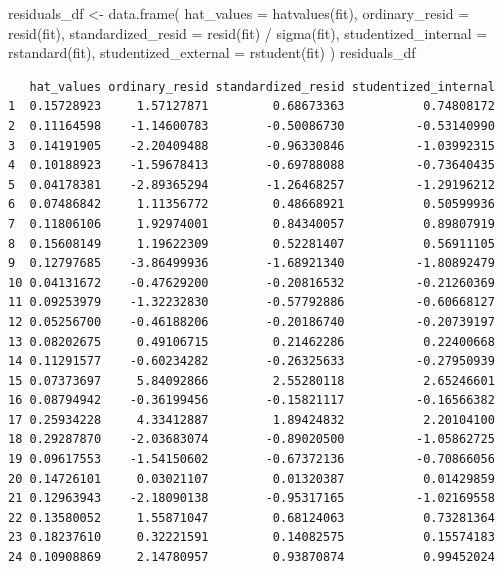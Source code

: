 \documentclass[
  letterpaper,
]{scrbook}
\newenvironment{Shaded}{\begin{snugshade}}{\end{snugshade}}
\newcommand{\AttributeTok}[1]{\textcolor[rgb]{0.40,0.45,0.13}{#1}}
\newcommand{\FunctionTok}[1]{\textcolor[rgb]{0.28,0.35,0.67}{#1}}
\newcommand{\NormalTok}[1]{\textcolor[rgb]{0.00,0.23,0.31}{#1}}
\newcommand{\OtherTok}[1]{\textcolor[rgb]{0.00,0.23,0.31}{#1}}
\newcommand{\SpecialCharTok}[1]{\textcolor[rgb]{0.37,0.37,0.37}{#1}}
\begin{document}
\begin{Shaded}
\begin{Highlighting}[]
\NormalTok{residuals\_df }\OtherTok{\textless{}{-}} \FunctionTok{data.frame}\NormalTok{(}
  \AttributeTok{hat\_values =} \FunctionTok{hatvalues}\NormalTok{(fit),}
  \AttributeTok{ordinary\_resid =} \FunctionTok{resid}\NormalTok{(fit),}
  \AttributeTok{standardized\_resid =} \FunctionTok{resid}\NormalTok{(fit) }\SpecialCharTok{/} \FunctionTok{sigma}\NormalTok{(fit),}
  \AttributeTok{studentized\_internal =} \FunctionTok{rstandard}\NormalTok{(fit),}
  \AttributeTok{studentized\_external =} \FunctionTok{rstudent}\NormalTok{(fit)}
\NormalTok{)}
\NormalTok{residuals\_df}
\end{Highlighting}
\end{Shaded}

\begin{verbatim}
   hat_values ordinary_resid standardized_resid studentized_internal
1  0.15728923     1.57127871         0.68673363           0.74808172
2  0.11164598    -1.14600783        -0.50086730          -0.53140990
3  0.14191905    -2.20409488        -0.96330846          -1.03992315
4  0.10188923    -1.59678413        -0.69788088          -0.73640435
5  0.04178381    -2.89365294        -1.26468257          -1.29196212
6  0.07486842     1.11356772         0.48668921           0.50599936
7  0.11806106     1.92974001         0.84340057           0.89807919
8  0.15608149     1.19622309         0.52281407           0.56911105
9  0.12797685    -3.86499936        -1.68921340          -1.80892479
10 0.04131672    -0.47629200        -0.20816532          -0.21260369
11 0.09253979    -1.32232830        -0.57792886          -0.60668127
12 0.05256700    -0.46188206        -0.20186740          -0.20739197
13 0.08202675     0.49106715         0.21462286           0.22400668
14 0.11291577    -0.60234282        -0.26325633          -0.27950939
15 0.07373697     5.84092866         2.55280118           2.65246601
16 0.08794942    -0.36199456        -0.15821117          -0.16566382
17 0.25934228     4.33412887         1.89424832           2.20104100
18 0.29287870    -2.03683074        -0.89020500          -1.05862725
19 0.09617553    -1.54150602        -0.67372136          -0.70866056
20 0.14726101     0.03021107         0.01320387           0.01429859
21 0.12963943    -2.18090138        -0.95317165          -1.02169558
22 0.13580052     1.55871047         0.68124063           0.73281364
23 0.18237610     0.32221591         0.14082575           0.15574183
24 0.10908869     2.14780957         0.93870874           0.99452024

\end{verbatim}
\end{document}
